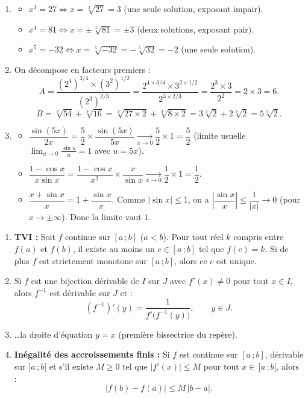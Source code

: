 \documentclass[11pt]{article}
\begin{document}
\begin{corrige}
\begin{enumerate}
\item \begin{itemize}
\item $x^3=27 \iff x=\sqrt[3]{27}=3$ (une seule solution, exposant impair).
\item $x^4=81 \iff x=\pm\sqrt[4]{81}=\pm 3$ (deux solutions, exposant pair).
\item $x^5=-32 \iff x=\sqrt[5]{-32}=-\sqrt[5]{32}=-2$ (une seule solution).
\end{itemize}

\item On décompose en facteurs premiers :
\[ A=\frac{(2^4)^{3/4}\times(3^2)^{1/2}}{(2^3)^{2/3}}=\frac{2^{4\times 3/4}\times 3^{2\times 1/2}}{2^{3\times 2/3}}=\frac{2^3\times 3}{2^2}=2\times 3=6. \]
\[ B=\sqrt[3]{54}+\sqrt[3]{16}=\sqrt[3]{27\times 2}+\sqrt[3]{8\times 2}=3\sqrt[3]{2}+2\sqrt[3]{2}=5\sqrt[3]{2}. \]

\item \begin{itemize}
\item $\dfrac{\sin(5x)}{2x}=\dfrac{5}{2}\times\dfrac{\sin(5x)}{5x}\xrightarrow[x\to 0]{}\dfrac{5}{2}\times 1=\dfrac{5}{2}$ (limite usuelle $\lim_{u\to 0}\frac{\sin u}{u}=1$ avec $u=5x$).
\item $\dfrac{1-\cos x}{x\sin x}=\dfrac{1-\cos x}{x^2}\times\dfrac{x}{\sin x}\xrightarrow[x\to 0]{}\dfrac{1}{2}\times 1=\dfrac{1}{2}$.
\item $\dfrac{x+\sin x}{x}=1+\dfrac{\sin x}{x}$. Comme $|\sin x|\le 1$, on a $\left|\dfrac{\sin x}{x}\right|\le \dfrac{1}{|x|}\to 0$ (pour $x\to\pm\infty$). Donc la limite vaut $1$.
\end{itemize}
\end{enumerate}
\end{corrige}

\begin{corrige}
\begin{enumerate}
\item \textbf{TVI :} Soit $f$ continue sur $[a\,;b]$ ($a<b$). Pour tout réel $k$ compris entre $f(a)$ et $f(b)$, il existe au moins un $c\in[a\,;b]$ tel que $f(c)=k$. Si de plus $f$ est strictement monotone sur $[a\,;b]$, alors ce $c$ est unique.

\item Si $f$ est une bijection dérivable de $I$ sur $J$ avec $f'(x)\neq 0$ pour tout $x\in I$, alors $f^{-1}$ est dérivable sur $J$ et :
\[ (f^{-1})'(y)=\frac{1}{f'\big(f^{-1}(y)\big)},\qquad y\in J. \]

\item \ldots la droite d'équation $y=x$ (première bissectrice du repère).

\item \textbf{Inégalité des accroissements finis :} Si $f$ est continue sur $[a\,;b]$, dérivable sur $]a\,;b[$ et s'il existe $M\ge 0$ tel que $|f'(x)|\le M$ pour tout $x\in\,]a\,;b[$, alors :
\[ |f(b)-f(a)|\le M\,|b-a|. \]
\end{enumerate}
\end{corrige}
\end{document}
